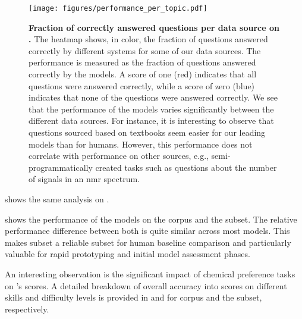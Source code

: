 \begin{figure}[htb]
    \centering
    \texttt{[image: figures/performance\_per\_topic.pdf]}
    \caption{\textbf{Fraction of correctly answered questions per data source on \chembenchmini.} The heatmap shows, in color, the fraction of questions answered correctly by different systems for some of our data sources. The performance is measured as the fraction of questions answered correctly by the models. A score of one (red) indicates that all questions were answered correctly, while a score of zero (blue) indicates that none of the questions were answered correctly.
        We see that the performance of the models varies significantly between the different data sources. For instance, it is interesting to observe that questions sourced based on textbooks seem easier for our leading models than for humans. However, this performance does not correlate with performance on other sources, e.g., semi-programmatically created tasks such as questions about the number of signals in an \gls{nmr} spectrum.
    }
    \label{fig:performance_per_topic}
\end{figure}

 shows the same analysis on \chembenchmini.

 shows the performance of the models on the \chembench corpus and the \chembenchmini subset. The relative performance difference between both is quite similar across most models.
This makes \chembenchmini subset a reliable subset for human baseline comparison and particularly valuable for rapid prototyping and initial model assessment phases.

An interesting observation is the significant impact of chemical preference tasks on \GPTFour's scores. A detailed breakdown of overall accuracy into scores on different skills and difficulty levels is provided in  and  for \chembench corpus and the \chembenchmini subset, respectively.


